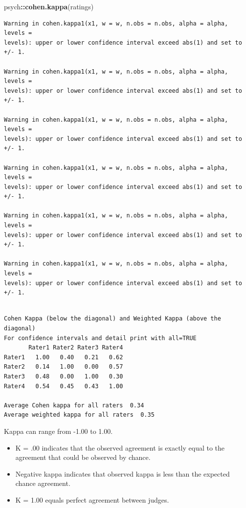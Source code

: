 \documentclass[
  english,
]{book}
\newenvironment{Shaded}{\begin{snugshade}}{\end{snugshade}}
\newcommand{\KeywordTok}[1]{\textcolor[rgb]{0.13,0.29,0.53}{\textbf{#1}}}
\newcommand{\NormalTok}[1]{#1}
\newcommand{\OperatorTok}[1]{\textcolor[rgb]{0.81,0.36,0.00}{\textbf{#1}}}
\providecommand{\tightlist}{%
  \setlength{\itemsep}{0pt}\setlength{\parskip}{0pt}}
\begin{document}
\begin{Shaded}
\begin{Highlighting}[]
\NormalTok{psych}\OperatorTok{::}\KeywordTok{cohen.kappa}\NormalTok{(ratings)}
\end{Highlighting}
\end{Shaded}

\begin{verbatim}
Warning in cohen.kappa1(x1, w = w, n.obs = n.obs, alpha = alpha, levels =
levels): upper or lower confidence interval exceed abs(1) and set to +/- 1.

Warning in cohen.kappa1(x1, w = w, n.obs = n.obs, alpha = alpha, levels =
levels): upper or lower confidence interval exceed abs(1) and set to +/- 1.

Warning in cohen.kappa1(x1, w = w, n.obs = n.obs, alpha = alpha, levels =
levels): upper or lower confidence interval exceed abs(1) and set to +/- 1.

Warning in cohen.kappa1(x1, w = w, n.obs = n.obs, alpha = alpha, levels =
levels): upper or lower confidence interval exceed abs(1) and set to +/- 1.

Warning in cohen.kappa1(x1, w = w, n.obs = n.obs, alpha = alpha, levels =
levels): upper or lower confidence interval exceed abs(1) and set to +/- 1.

Warning in cohen.kappa1(x1, w = w, n.obs = n.obs, alpha = alpha, levels =
levels): upper or lower confidence interval exceed abs(1) and set to +/- 1.
\end{verbatim}

\begin{verbatim}

Cohen Kappa (below the diagonal) and Weighted Kappa (above the diagonal) 
For confidence intervals and detail print with all=TRUE
       Rater1 Rater2 Rater3 Rater4
Rater1   1.00   0.40   0.21   0.62
Rater2   0.14   1.00   0.00   0.57
Rater3   0.48   0.00   1.00   0.30
Rater4   0.54   0.45   0.43   1.00

Average Cohen kappa for all raters  0.34
Average weighted kappa for all raters  0.35
\end{verbatim}

Kappa can range from -1.00 to 1.00.

\begin{itemize}
\tightlist
\item
  K = .00 indicates that the observed agreement is exactly equal to the agreement that could be observed by chance.
\item
  Negative kappa indicates that observed kappa is less than the expected chance agreement.
\item
  K = 1.00 equals perfect agreement between judges.
\end{itemize}
\end{document}
